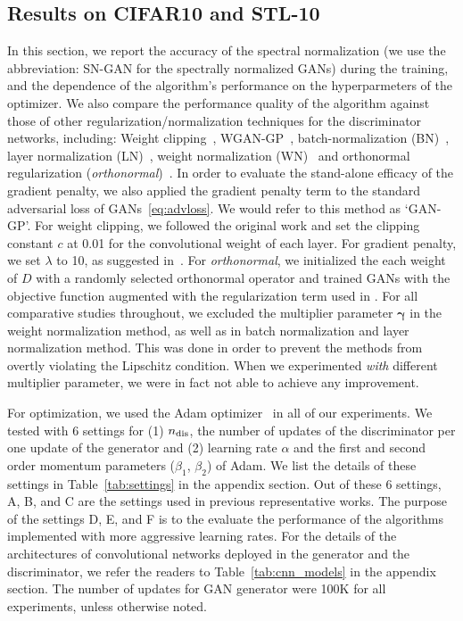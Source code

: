 \subsection{Results on CIFAR10 and STL-10} In this section, we report the accuracy of the spectral normalization (we use the abbreviation: SN-GAN for the spectrally normalized GANs) during the training, and the dependence of the algorithm's performance on the hyperparmeters of the optimizer. We also compare the performance quality of the algorithm against those of other regularization/normalization techniques for the discriminator networks, including: Weight clipping~\cite[]{arjovsky2017wasserstein}, WGAN-GP~\cite[]{gulrajani2017improved}, batch-normalization (BN)~\cite[]{ioffe2015batch}, layer normalization (LN)~\cite[]{ba2016layer}, weight normalization (WN)~\cite[]{salimans2016weight} and orthonormal regularization (\textit{orthonormal})~\cite[]{brock2016neural}.
In order to evaluate the stand-alone efficacy of the gradient penalty, we also applied the gradient penalty term to the standard adversarial loss of GANs~\eqref{eq:advloss}.
We would refer to this method as `GAN-GP'. For weight clipping, we followed the original work \cite{arjovsky2017wasserstein} and set the clipping constant $c$ at 0.01 for the convolutional weight of each layer. For gradient penalty, we set $\lambda$ to 10, as suggested in~\cite{gulrajani2017improved}. For \textit{orthonormal}, we initialized the each weight of $D$ with a randomly selected orthonormal operator and trained GANs with the objective function augmented with the regularization term used in \cite{brock2016neural}. For all comparative studies throughout, we excluded the multiplier parameter ${\bm \gamma}$ in the weight normalization method, as well as in batch normalization and layer normalization method. This was done in order to prevent the methods from overtly violating the Lipschitz condition. When we experimented \textit{with} different multiplier parameter, we were in fact not able to achieve any improvement.

For optimization, we used the Adam optimizer~\cite{kingma2014adam} in all of our experiments. We tested with 6 settings for (1) $n_{\rm dis}$, the number of updates of the discriminator per one update of the generator and (2) learning rate $\alpha$ and the first and second order momentum parameters ($\beta_1$, $\beta_2$) of Adam. We list the details of these settings in Table~\ref{tab:settings} in the appendix section. Out of these 6 settings, A, B, and C are the settings used in previous representative works. The purpose of the settings D, E, and F is to the evaluate the performance of the algorithms implemented with more aggressive learning rates. For the details of the architectures of convolutional networks deployed in the generator and the discriminator, we refer the readers to Table~\ref{tab:cnn_models} in the appendix section. The number of updates for GAN generator were 100K for all experiments, unless otherwise noted.

